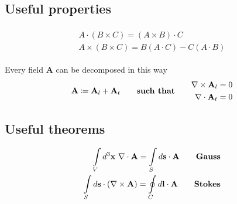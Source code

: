 \documentclass[a4paper, twocolumn]{article}
\begin{document}
\subsection{Useful properties}
\label{sec:useful-properties}
\begin{gather}
  \label{eq:37}
  \begin{split}
    A\cdot(B\times C)=(A\times B)\cdot C \\
    A\times(B\times C)=B(A\cdot C)-C(A\cdot B)
  \end{split}
\end{gather}

Every field $\mathbf{A}$ can be decomposed in this way
\begin{align*}
  \begin{aligned}
    \mathbf{A}\coloneqq\mathbf{A}_l+\mathbf{A}_t \\
  \end{aligned}
  \qquad \text{\textbf{such that}}\qquad 
  \begin{aligned}
    \nabla\times\mathbf{A}_l=0 \\
    \nabla\cdot\mathbf{A}_t =0\\
  \end{aligned}
\end{align*}

\subsection{Useful theorems}
\label{sec:useful-theorems}

\begin{gather}
  \label{eq:38}
  \begin{split}
    \int \displaylimits_V d^3\textbf{x}~ \nabla\cdot\mathbf{A}=\int\displaylimits_S d\mathbf{s}\cdot \mathbf{A} \qquad   \text{\textbf{Gauss}} \\
    \int\displaylimits_S d\mathbf{s}\cdot(\nabla\times \mathbf{A})=\oint\displaylimits_C d\mathbf{l}\cdot\mathbf{A} \qquad \text{\textbf{Stokes}}
  \end{split} 
\end{gather}
\end{document}
